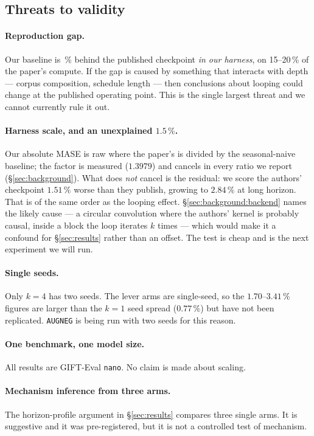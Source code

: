 \subsection{Threats to validity}

\paragraph{Reproduction gap.} Our baseline is \ReproGap\,\% behind the published
checkpoint \emph{in our harness}, on 15--20\,\% of the paper's compute. If the
gap is caused by something that interacts with depth --- corpus composition,
schedule length --- then conclusions about looping could change at the
published operating point. This is the single largest threat and we cannot
currently rule it out.

\paragraph{Harness scale, and an unexplained $1.5\,\%$.} Our absolute MASE is
raw where the paper's is divided by the seasonal-naive baseline; the factor is
measured ($1.3979$) and cancels in every ratio we report
(\S\ref{sec:background}). What does \emph{not} cancel is the residual: we score
the authors' checkpoint $1.51\,\%$ worse than they publish, growing to
$2.84\,\%$ at long horizon. That is of the same order as the looping effect.
\S\ref{sec:background:backend} names the likely cause --- a circular
convolution where the authors' kernel is probably causal, inside a block the
loop iterates $k$ times --- which would make it a confound for
\S\ref{sec:results} rather than an offset. The test is cheap and is the next
experiment we will run.

\paragraph{Single seeds.} Only $k=4$ has two seeds. The lever arms are
single-seed, so the $1.70$--$3.41\,\%$ figures are larger than the $k=1$ seed
spread ($0.77\,\%$) but have not been replicated. \texttt{AUGNEG} is being run
with two seeds for this reason.

\paragraph{One benchmark, one model size.} All results are GIFT-Eval
\texttt{nano}. No claim is made about scaling.

\paragraph{Mechanism inference from three arms.} The horizon-profile argument
in \S\ref{sec:results} compares three single arms. It is suggestive and it was
pre-registered, but it is not a controlled test of mechanism.
